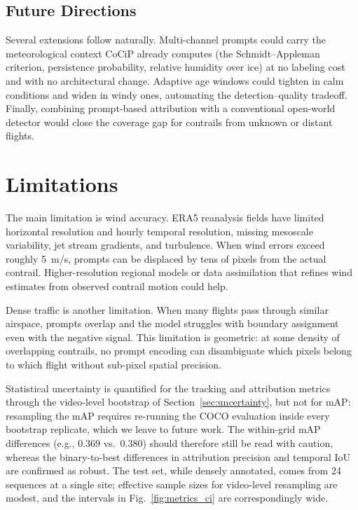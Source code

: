 \documentclass[1p,11pt]{elsarticle}
\begin{document}
\subsection{Future Directions}

Several extensions follow naturally. Multi-channel prompts could carry the meteorological context CoCiP already computes (the Schmidt--Appleman criterion, persistence probability, relative humidity over ice) at no labeling cost and with no architectural change. Adaptive age windows could tighten in calm conditions and widen in windy ones, automating the detection--quality tradeoff. Finally, combining prompt-based attribution with a conventional open-world detector would close the coverage gap for contrails from unknown or distant flights.

\section{Limitations}
\label{sec:limitations}

The main limitation is wind accuracy. ERA5 reanalysis fields have limited horizontal resolution and hourly temporal resolution, missing mesoscale variability, jet stream gradients, and turbulence. When wind errors exceed roughly 5~m/s, prompts can be displaced by tens of pixels from the actual contrail. Higher-resolution regional models or data assimilation that refines wind estimates from observed contrail motion could help.

Dense traffic is another limitation. When many flights pass through similar airspace, prompts overlap and the model struggles with boundary assignment even with the negative signal. This limitation is geometric: at some density of overlapping contrails, no prompt encoding can disambiguate which pixels belong to which flight without sub-pixel spatial precision.

Statistical uncertainty is quantified for the tracking and attribution metrics through the video-level bootstrap of Section~\ref{sec:uncertainty}, but not for mAP: resampling the mAP requires re-running the COCO evaluation inside every bootstrap replicate, which we leave to future work. The within-grid mAP differences (e.g., 0.369 vs.\ 0.380) should therefore still be read with caution, whereas the binary-to-best differences in attribution precision and temporal IoU are confirmed as robust. The test set, while densely annotated, comes from 24 sequences at a single site; effective sample sizes for video-level resampling are modest, and the intervals in Fig.~\ref{fig:metrics_ci} are correspondingly wide.
\end{document}
